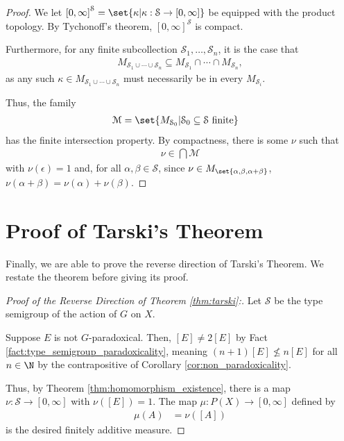 \begin{proof}
  We let $\left[0,\infty\right]^{\mathcal{S}} = \set{\kappa| \kappa:\mathcal{S}\rightarrow [0,\infty]}$ be equipped with the product topology. By Tychonoff's theorem, $\left[0,\infty\right]^{\mathcal{S}}$ is compact.\newline

  Furthermore, for any finite subcollection $\mathcal{S}_1,\dots,\mathcal{S}_n$, it is the case that
  \begin{align*}
    M_{\mathcal{S}_1\cup\cdots\cup \mathcal{S}_n} \subseteq M_{\mathcal{S}_1} \cap \cdots \cap M_{\mathcal{S}_n},
  \end{align*}
  as any such $\kappa\in M_{\mathcal{S}_1\cup\cdots\cup \mathcal{S}_n}$ must necessarily be in every $M_{\mathcal{S}_i}$.\newline

  Thus, the family
  \begin{align*}
    \mathcal{M} &= \set{M_{\mathcal{S}_0}| \mathcal{S}_0\subseteq \mathcal{S}\text{ finite}}
  \end{align*}
  has the finite intersection property. By compactness, there is some $\nu$ such that
  \begin{align*}
    \nu\in \bigcap \mathcal{M}
  \end{align*}
  with $\nu\left(\epsilon\right) = 1$ and, for all $\alpha,\beta\in \mathcal{S}$, since $\nu\in M_{\set{\alpha,\beta,\alpha + \beta}}$, $\nu\left(\alpha + \beta\right) = \nu\left(\alpha\right) + \nu\left(\beta\right)$.
\end{proof}
\section{Proof of Tarski's Theorem}%
Finally, we are able to prove the reverse direction of Tarski's Theorem. We restate the theorem before giving its proof.
\begin{tcolorbox}[blanker,breakable,left=3mm,before skip=10pt, after skip=10pt, borderline west={1pt}{0pt}{blue!50!white},sharp corners,]
\tarski*
\end{tcolorbox}
\begin{proof}[Proof of the Reverse Direction of Theorem \ref{thm:tarski}:]
  Let $\mathcal{S}$ be the type semigroup of the action of $G$ on $X$.\newline

  Suppose $E$ is not $G$-paradoxical. Then, $\left[E\right]\neq 2\left[E\right]$ by Fact \ref{fact:type_semigroup_paradoxicality}, meaning $\left(n+1\right)\left[E\right]\nleq n\left[E\right]$ for all $n\in \N$ by the contrapositive of Corollary \ref{cor:non_paradoxicality}.\newline

  Thus, by Theorem \ref{thm:homomorphism_existence}, there is a map $\nu\colon \mathcal{S}\rightarrow [0,\infty]$ with $\nu\left(\left[E\right]\right) = 1$. The map $\mu\colon P(X)\rightarrow [0,\infty]$ defined by
  \begin{align*}
    \mu\left(A\right) &= \nu\left(\left[A\right]\right)
  \end{align*}
  is the desired finitely additive measure.
\end{proof}
